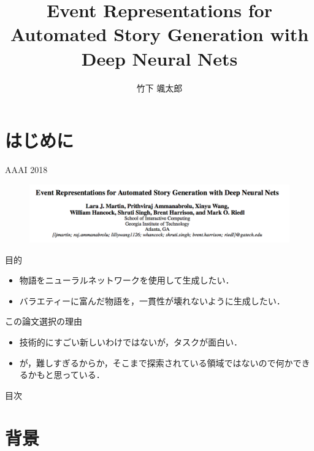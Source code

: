 \documentclass[dvipdfmx, 12pt]{beamer}
\begin{document}
\title{Event Representations for Automated Story Generation with Deep Neural Nets}
\author{竹下 颯太郎}

\begin{frame}{}
\titlepage
\end{frame}


\section{はじめに}

\begin{frame}{AAAI 2018}
  \begin{figure}
    \includegraphics[width=1.0\textwidth]{imgs/paper.png}
  \end{figure}
\end{frame}

\begin{frame}{目的}
  \begin{itemize}
    \item 物語をニューラルネットワークを使用して生成したい．
    \item バラエティーに富んだ物語を，一貫性が壊れないように生成したい．
  \end{itemize}

  \begin{block}{この論文選択の理由}
    \begin{itemize}
      \item 技術的にすごい新しいわけではないが，タスクが面白い．
      \item が，難しすぎるからか，そこまで探索されている領域ではないので何かできるかもと思っている．
    \end{itemize}
  \end{block}
\end{frame}


\begin{frame}{目次}
\tableofcontents
\end{frame}


\section{背景}
\end{document}
